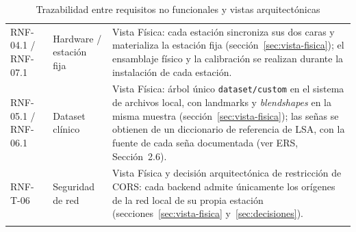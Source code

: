 \begin{longtable}{>{\raggedright\arraybackslash}p{2.3cm} >{\raggedright\arraybackslash}p{2.8cm} >{\raggedright\arraybackslash}p{8.6cm}}
    RNF-04.1 / RNF-07.1 & Hardware / estación fija &
    Vista Física: cada estación sincroniza sus dos caras y materializa la
    estación fija (sección~\ref{sec:vista-fisica}); el ensamblaje físico y
    la calibración se realizan durante la instalación de cada estación. \\

    RNF-05.1 / RNF-06.1 & Dataset clínico &
    Vista Física: árbol único \texttt{dataset/custom} en el sistema de
    archivos local, con landmarks y \textit{blendshapes} en la misma muestra
    (sección~\ref{sec:vista-fisica});
    las señas se obtienen de un diccionario de referencia de LSA, con la
    fuente de cada seña documentada (ver ERS, Sección~2.6). \\

    RNF-T-06 & Seguridad de red &
    Vista Física y decisión arquitectónica de restricción de CORS: cada
    backend admite únicamente los orígenes de la red local de su propia
    estación (secciones~\ref{sec:vista-fisica} y~\ref{sec:decisiones}). \\
    \bottomrule
    \caption{Trazabilidad entre requisitos no funcionales y vistas arquitectónicas}
    \label{tab:arq-rnf}
\end{longtable}
